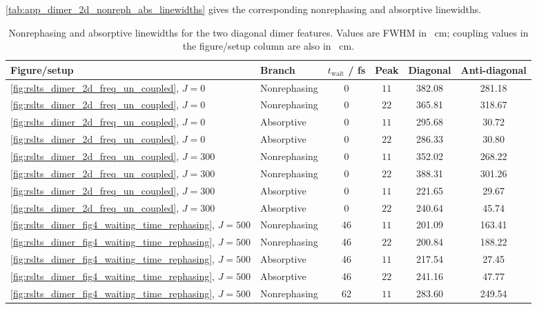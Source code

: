 \autoref{tab:app_dimer_2d_nonreph_abs_linewidths} gives the corresponding
nonrephasing and absorptive linewidths.

\begin{table}[htbp]
    \centering
    \scriptsize
    \caption{Nonrephasing and absorptive linewidths for the two diagonal dimer
    features. Values are FWHM in \si{\per\centi\metre}; coupling values in the
    figure/setup column are also in \si{\per\centi\metre}.}
    \label{tab:app_dimer_2d_nonreph_abs_linewidths}
    \begin{tabular}{@{}llcccc@{}}
        \toprule
        Figure/setup & Branch & $t_{\mathrm{wait}}$ / fs & Peak & Diagonal & Anti-diagonal \\
        \midrule
        \autoref{fig:rslts_dimer_2d_freq_un_coupled}, $J=0$ & Nonrephasing & 0 & $11$ & 382.08 & 281.18 \\
        \autoref{fig:rslts_dimer_2d_freq_un_coupled}, $J=0$ & Nonrephasing & 0 & $22$ & 365.81 & 318.67 \\
        \autoref{fig:rslts_dimer_2d_freq_un_coupled}, $J=0$ & Absorptive & 0 & $11$ & 295.68 & 30.72 \\
        \autoref{fig:rslts_dimer_2d_freq_un_coupled}, $J=0$ & Absorptive & 0 & $22$ & 286.33 & 30.80 \\
        \autoref{fig:rslts_dimer_2d_freq_un_coupled}, $J=300$ & Nonrephasing & 0 & $11$ & 352.02 & 268.22 \\
        \autoref{fig:rslts_dimer_2d_freq_un_coupled}, $J=300$ & Nonrephasing & 0 & $22$ & 388.31 & 301.26 \\
        \autoref{fig:rslts_dimer_2d_freq_un_coupled}, $J=300$ & Absorptive & 0 & $11$ & 221.65 & 29.67 \\
        \autoref{fig:rslts_dimer_2d_freq_un_coupled}, $J=300$ & Absorptive & 0 & $22$ & 240.64 & 45.74 \\
        \autoref{fig:rslts_dimer_fig4_waiting_time_rephasing}, $J=500$ & Nonrephasing & 46 & $11$ & 201.09 & 163.41 \\
        \autoref{fig:rslts_dimer_fig4_waiting_time_rephasing}, $J=500$ & Nonrephasing & 46 & $22$ & 200.84 & 188.22 \\
        \autoref{fig:rslts_dimer_fig4_waiting_time_rephasing}, $J=500$ & Absorptive & 46 & $11$ & 217.54 & 27.45 \\
        \autoref{fig:rslts_dimer_fig4_waiting_time_rephasing}, $J=500$ & Absorptive & 46 & $22$ & 241.16 & 47.77 \\
        \autoref{fig:rslts_dimer_fig4_waiting_time_rephasing}, $J=500$ & Nonrephasing & 62 & $11$ & 283.60 & 249.54 \\

\end{tabular}
\end{table}
